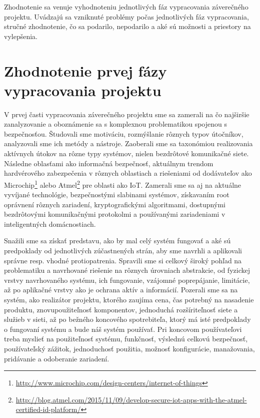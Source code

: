 \documentclass[12pt,a4wide,oneside,openright]{report}
\begin{document}
Zhodnotenie sa venuje vyhodnoteniu jednotlivých fáz vypracovania záverečného projektu. Uvádzajú sa vzniknuté problémy počas jednotlivých fáz vypracovania, stručné zhodnotenie, čo sa podarilo, nepodarilo a aké sú možnosti a priestory na vylepšenia.

\section{Zhodnotenie prvej fázy vypracovania projektu}
V prvej časti vypracovania záverečného projektu sme sa zamerali na čo najširšie zanalyzovanie a oboznámenie sa s komplexnou problematikou spojenou s bezpečnosťou. Študovali sme motiváciu, rozmýšlanie rôznych typov útočníkov, analyzovali sme ich metódy a nástroje. Zaoberali sme sa taxonómiou realizovania aktívnych útokov na rôzne typy systémov, nielen bezdrôtové komunikačné siete. Následne oblasťami ako informačná bezpečnosť, aktuálnym trendom hardvérového zabezpečenia v rôznych oblastiach a riešeniami od dodávateľov ako Microchip\footnote{\url{http://www.microchip.com/design-centers/internet-of-things}} alebo Atmel\footnote{\url{http://blog.atmel.com/2015/11/09/develop-secure-iot-apps-with-the-atmel-certified-id-platform/}} pre oblasti ako IoT. Zamerali sme sa aj na aktuálne vyvíjané technológie, bezpečnostými slabinami systémov, získavaním root oprávnení rôznych zariadení, kryptografickými algoritmami, dostupnými bezdrôtovými komunikačnými protokolmi a používanými zariadeniami v inteligentných domácnostiach.


Snažili sme sa získať predstavu, ako by mal celý systém fungovať a aké sú predpoklady od jednotlivých zúčastnených strán, aby sme navrhli a aplikovali správne resp. vhodné protiopatrenia.
Spravili sme si celkový široký pohľad na problematiku a navrhované riešenie na rôznych úrovniach abstrakcie, od fyzickej vrstvy navrhovaného systému, ich fungovanie, vzájomné poprepájanie, limitácie, až po aplikačné vrstvy ako je ochrana aktív a informácií. Pozerali sme sa na systém, ako realizátor projektu, ktorého zaujíma cena, čas potrebný na nasadenie produktu, znovupoužiteľnosť komponentov, jednoduchá rozšíriteľnosť siete a služieb v sieti, až po bežného koncového spotrebiteľa, ktorý má isté predpoklady o fungovaní systému a bude náš systém používať. Pri koncovom používateľovi treba myslieť na použiteľnosť systému, funkčnosť, výslednú celkovú bezpečnosť, používateľský zážitok, jednoduchosť použitia, možnosť konfigurácie, manažovania, pridávanie a odoberanie zariadení.
\end{document}
